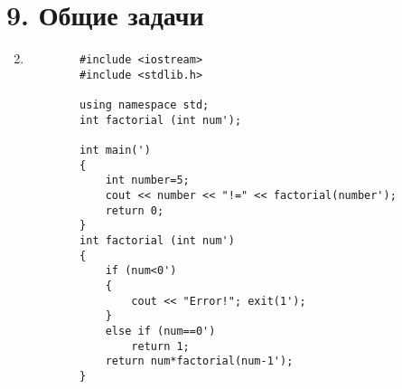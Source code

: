 \section*{9. Общие задачи}
\begin{enumerate}[leftmargin=*]
    \setcounter{enumi}{1}
    \item \mbox{} \begin{lstlisting}
        #include <iostream>
        #include <stdlib.h>

        using namespace std;
        int factorial (int num');

        int main(')
        {
            int number=5;
            cout << number << "!=" << factorial(number');
            return 0;
        }
        int factorial (int num')
        {
            if (num<0')
            {
                cout << "Error!"; exit(1');
            }
            else if (num==0')
                return 1;
            return num*factorial(num-1');
        }
    \end{lstlisting}
\end{enumerate}